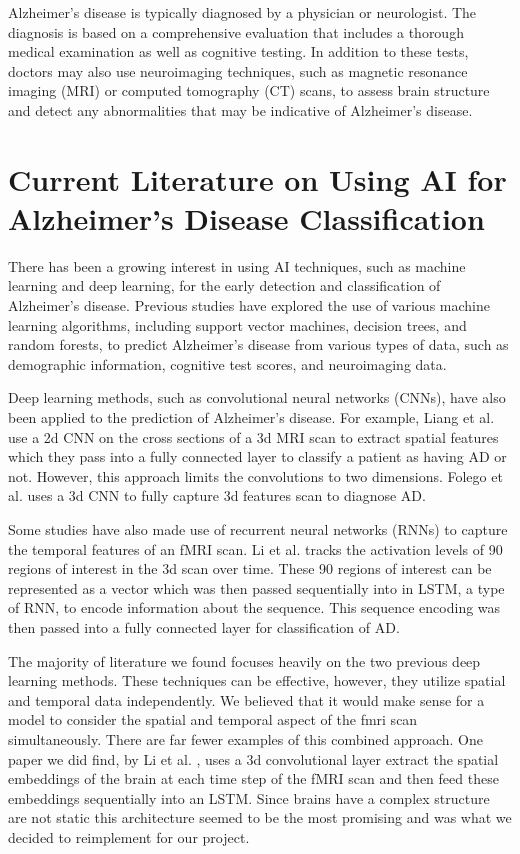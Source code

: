 \documentclass[11pt]{article}
\begin{document}
	Alzheimer's disease is typically diagnosed by a physician or neurologist. The diagnosis is based on a comprehensive evaluation that includes a thorough medical examination as well as cognitive testing. In addition to these tests, doctors may also use neuroimaging techniques, such as magnetic resonance imaging (MRI) or computed tomography (CT) scans, to assess brain structure and detect any abnormalities that may be indicative of Alzheimer's disease. 

	\section{Current Literature on Using AI for Alzheimer's Disease Classification}

	There has been a growing interest in using AI techniques, such as machine learning and deep learning, for the early detection and classification of Alzheimer's disease. Previous studies have explored the use of various machine learning algorithms, including support vector machines, decision trees, and random forests, to predict Alzheimer's disease from various types of data, such as demographic information, cognitive test scores, and neuroimaging data.

	Deep learning methods, such as convolutional neural networks (CNNs), have also been applied to the prediction of Alzheimer's disease. For example, Liang et al. \cite{2d-CNN} use a 2d CNN on the cross sections of a 3d MRI scan to extract spatial features which they pass into a fully connected layer to classify a patient as having AD or not. However, this approach limits the convolutions to two dimensions. Folego et al. \cite{3d-CNN} uses a 3d CNN to fully capture 3d features scan to diagnose AD.  
	
	Some studies have also made use of recurrent neural networks (RNNs) to capture the temporal features of an fMRI scan. Li et al. \cite{LSTM} tracks the activation levels of 90 regions of interest in the 3d scan over time. These 90 regions of interest can be represented as a vector which was then passed sequentially into in LSTM, a type of RNN, to encode information about the sequence. This sequence encoding was then passed into a fully connected layer for classification of AD.  

	The majority of literature we found focuses heavily on the two previous deep learning methods. These techniques can be effective, however, they utilize spatial and temporal data independently. We believed that it would make sense for a model to consider the spatial and temporal aspect of the fmri scan simultaneously. There are far fewer examples of this combined approach. One paper we did find, by Li et al. \cite{Conv-LSTM}, uses a 3d convolutional layer extract the spatial embeddings of the brain at each time step of the fMRI scan and then feed these embeddings sequentially into an LSTM. Since brains have a complex structure are not static this architecture seemed to be the most promising and was what we decided to reimplement for our project.
	
\end{document}
